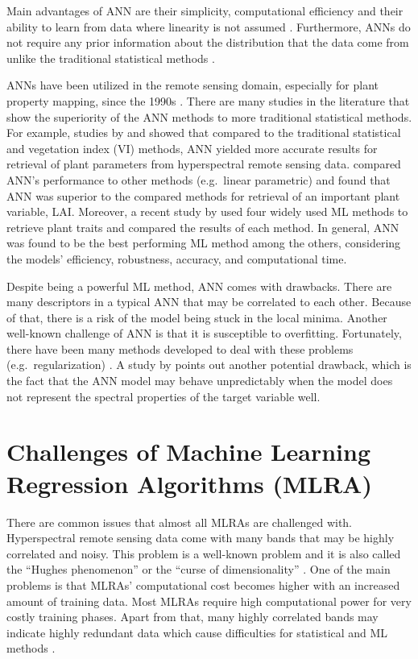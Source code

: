 \documentclass[a4paper, twoside]{templates/ociamthesis}
\begin{document}
Main advantages of ANN are their simplicity, computational efficiency and their ability to learn from data where linearity is not assumed \citep{schlerf2006inversion, walczak2019artificial}. Furthermore, ANNs do not require any prior information about the distribution that the data come from unlike the traditional statistical methods \citep{walczak2019artificial}.

ANNs have been utilized in the remote sensing domain, especially for plant property mapping, since the 1990s \citep{verrelst2019quantifying}. There are many studies in the literature that show the superiority of the ANN methods to more traditional statistical methods. For example, studies by \citet{malenovsky2013retrieval} and \citet{kalacska2015estimation} showed that compared to the traditional statistical and vegetation index (VI) methods, ANN yielded more accurate results for retrieval of plant parameters from hyperspectral remote sensing data. \citet{neinavaz2016retrieval} compared ANN's performance to other methods (e.g.~linear parametric) and found that ANN was superior to the compared methods for retrieval of an important plant variable, LAI. Moreover, a recent study by \citet{danner2021efficient} used four widely used ML methods to retrieve plant traits and compared the results of each method. In general, ANN was found to be the best performing ML method among the others, considering the models' efficiency, robustness, accuracy, and computational time.

Despite being a powerful ML method, ANN comes with drawbacks. There are many descriptors in a typical ANN that may be correlated to each other. Because of that, there is a risk of the model being stuck in the local minima. Another well-known challenge of ANN is that it is susceptible to overfitting. Fortunately, there have been many methods developed to deal with these problems (e.g.~regularization) \citep{ghasemi2018neural}. A study by \citet{schlerf2006inversion} points out another potential drawback, which is the fact that the ANN model may behave unpredictably when the model does not represent the spectral properties of the target variable well.

\hypertarget{chml}{%
\section{Challenges of Machine Learning Regression Algorithms (MLRA)}\label{chml}}

There are common issues that almost all MLRAs are challenged with. Hyperspectral remote sensing data come with many bands that may be highly correlated and noisy. This problem is a well-known problem and it is also called the ``Hughes phenomenon'' \citep{hughes1968mean} or the ``curse of dimensionality'' \citep{danner2021efficient}. One of the main problems is that MLRAs' computational cost becomes higher with an increased amount of training data. Most MLRAs require high computational power for very costly training phases. Apart from that, many highly correlated bands may indicate highly redundant data which cause difficulties for statistical and ML methods \citep{rivera2017hyperspectral}.
\end{document}
